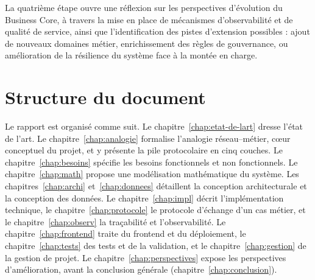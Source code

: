 La quatrième étape ouvre une réflexion sur les perspectives d'évolution du Business Core, à travers la mise en place de mécanismes d'observabilité et de qualité de service, ainsi que l'identification des pistes d'extension possibles : ajout de nouveaux domaines métier, enrichissement des règles de gouvernance, ou amélioration de la résilience du système face à la montée en charge.




\section{Structure du document}

Le rapport est organisé comme suit. Le chapitre~\ref{chap:etat-de-lart} dresse l'état de l'art.
Le chapitre~\ref{chap:analogie} formalise l'analogie réseau--métier, cœur conceptuel du
projet, et y présente la pile protocolaire en cinq couches. Le chapitre~\ref{chap:besoins}
spécifie les besoins fonctionnels et non fonctionnels. Le chapitre~\ref{chap:math} propose
une modélisation mathématique du système. Les chapitres~\ref{chap:archi}
et~\ref{chap:donnees} détaillent la conception architecturale et la conception des données.
Le chapitre~\ref{chap:impl} décrit l'implémentation technique, le
chapitre~\ref{chap:protocole} le protocole d'échange d'un cas métier, et le
chapitre~\ref{chap:observ} la traçabilité et l'observabilité. Le
chapitre~\ref{chap:frontend} traite du frontend et du déploiement, le
chapitre~\ref{chap:tests} des tests et de la validation, et le chapitre~\ref{chap:gestion}
de la gestion de projet. Le chapitre~\ref{chap:perspectives} expose les perspectives
d'amélioration, avant la conclusion générale (chapitre~\ref{chap:conclusion}).
